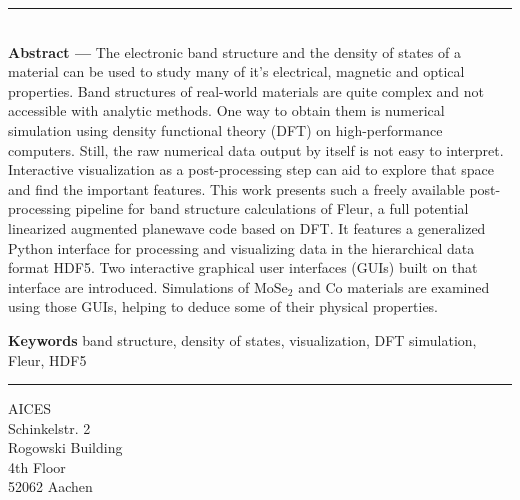 \clearpage


\thispagestyle{empty}

\vspace*{\fill}
\noindent\rule[2pt]{\textwidth}{0.5pt}\\
{\textbf{Abstract ---}}
The electronic band structure and the density of states of a material can be used
to study many of it's electrical, magnetic and optical properties. Band
structures of real-world materials are quite complex and not accessible with analytic methods. One way to obtain them is numerical simulation using density functional theory (DFT) on high-performance computers.
Still, the raw numerical data output by itself is not easy to interpret.
Interactive visualization as a post-processing step can aid to explore that
space and find the important features. This work presents such a freely available
post-processing pipeline for band structure calculations of Fleur, a full
potential linearized augmented planewave code based on DFT. It features a
generalized Python interface for processing and visualizing data in the
hierarchical data format HDF5. Two interactive graphical user interfaces (GUIs)
built on that interface are introduced. Simulations of $\textrm{MoSe}_2$ and
$\textrm{Co}$ materials are examined using those GUIs, helping to deduce
some of their physical properties.


{\textbf{Keywords}}
band structure, density of states, visualization, DFT simulation, Fleur, HDF5
\\


\noindent\rule[2pt]{\textwidth}{0.5pt}
\begin{center}
    AICES\\
    Schinkelstr. 2\\
    Rogowski Building\\
    4th Floor\\
    52062 Aachen    
\end{center}
\vspace*{\fill}

